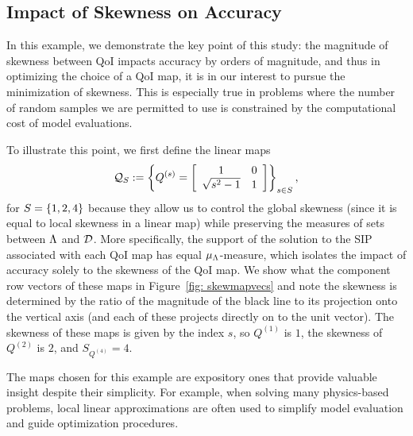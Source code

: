 \subsection{Impact of Skewness on Accuracy}\label{ex:skewness}
In this example, we demonstrate the key point of this study: the magnitude of skewness between QoI impacts accuracy by orders of magnitude, and thus in optimizing the choice of a QoI map, it is in our interest to pursue the minimization of skewness.
This is especially true in problems where the number of random samples we are permitted to use is constrained by the computational cost of model evaluations.


To illustrate this point, we first define the linear maps
\begin{equation}\label{eq:qmap2}
\qspace_S := \left \lbrace Q^{(s)} =  \mat{cc}{1 & 0 \\ \sqrt{s^2 - 1}& 1 } \right \rbrace_{s\in S},
\end{equation}
for $S=\set{1,2,4}$ because they allow us to control the global skewness (since it is equal to local skewness in a linear map) while preserving the measures of sets between $\pspace$ and $\dspace$.
More specifically, the support of the solution to the SIP associated with each QoI map has equal $\mu_\pspace$-measure, which isolates the impact of accuracy solely to the skewness of the QoI map.
We show what the component row vectors of these maps in Figure~\ref{fig: skewmapvecs} and note the skewness is determined by the ratio of the magnitude of the black line to its projection onto the vertical axis (and each of these projects directly on to the unit vector).
The skewness of these maps is given by the index $s$, so $Q^{(1)}$ is $1$, the skewness of $Q^{(2)}$ is $2$, and $S_{Q^{(4)}} = 4$.

The maps chosen for this example are expository ones that provide valuable insight despite their simplicity.
For example, when solving many physics-based problems, local linear approximations are often used to simplify model evaluation and guide optimization procedures.


